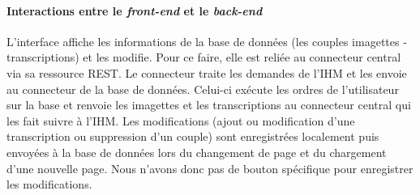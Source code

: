 \paragraph{Interactions entre le \textit{front-end} et le \textit{back-end}}

L’interface affiche les informations de la base de données (les couples imagettes - transcriptions) et les modifie. Pour ce faire, elle est reliée au connecteur central via sa ressource REST. Le connecteur traite les demandes de l’IHM et les envoie au connecteur de la base de données. Celui-ci exécute les ordres de l’utilisateur sur la base et renvoie les imagettes et les transcriptions au connecteur central qui les fait suivre à l’IHM. Les modifications (ajout ou modification d’une transcription ou suppression d’un couple) sont enregistrées localement puis envoyées à la base de données lors du changement de page et du chargement d'une nouvelle page. Nous n'avons donc pas de bouton spécifique pour enregistrer les modifications.

\newpage{}


